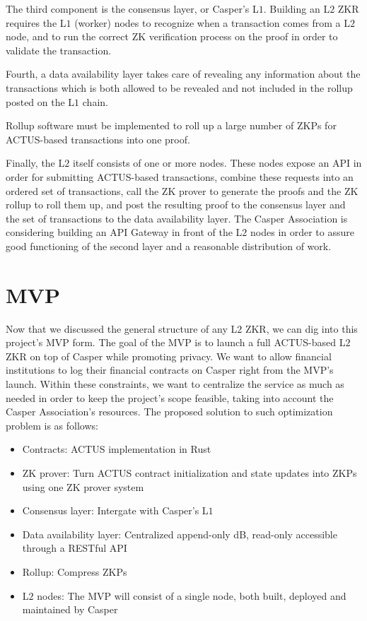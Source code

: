 \documentclass[12pt]{article}
\def\bi{\begin{itemize}}
\def\ei{\end{itemize}}
\begin{document}
The third component is the consensus layer, or Casper's L$1$. Building an L$2$
ZKR requires the L$1$ (worker) nodes to recognize when a transaction comes from
a L$2$ node, and to run the correct ZK verification process on the proof in
order to validate the transaction.

Fourth, a data availability layer takes care of revealing any information about
the transactions which is both allowed to be revealed and not included in the
rollup posted on the L$1$ chain.

Rollup software must be implemented to roll up a large number of ZKPs for
ACTUS-based transactions into one proof.

Finally, the L$2$ itself consists of one or more nodes. These nodes expose an
API in order for submitting ACTUS-based transactions, combine these requests
into an ordered set of transactions, call the ZK prover to generate the proofs
and the ZK rollup to roll them up, and post the resulting proof to the consensus
layer and the set of transactions to the data availability layer. The Casper
Association is considering building an API Gateway in front of the L$2$ nodes in
order to assure good functioning of the second layer and a reasonable
distribution of work.

\section{MVP} \label{mvp}

Now that we discussed the general structure of any L$2$ ZKR, we can dig into
this project's MVP form. The goal of the MVP is to launch a full ACTUS-based
L$2$ ZKR on top of Casper while promoting privacy. We want to allow financial
institutions to log their financial contracts on Casper right from the MVP's
launch. Within these constraints, we want to centralize the service as much as
needed in order to keep the project's scope feasible, taking into account the
Casper Association's resources. The proposed solution to such optimization
problem is as follows:
\bi
  \item Contracts: ACTUS implementation in Rust
  \item ZK prover: Turn ACTUS contract initialization and state updates into
    ZKPs using one ZK prover system
  \item Consensus layer: Intergate with Casper's L$1$
  \item Data availability layer: Centralized append-only dB, read-only
    accessible through a RESTful API
  \item Rollup: Compress ZKPs
  \item L$2$ nodes: The MVP will consist of a single node, both built, deployed
    and maintained by Casper
\ei
\end{document}

